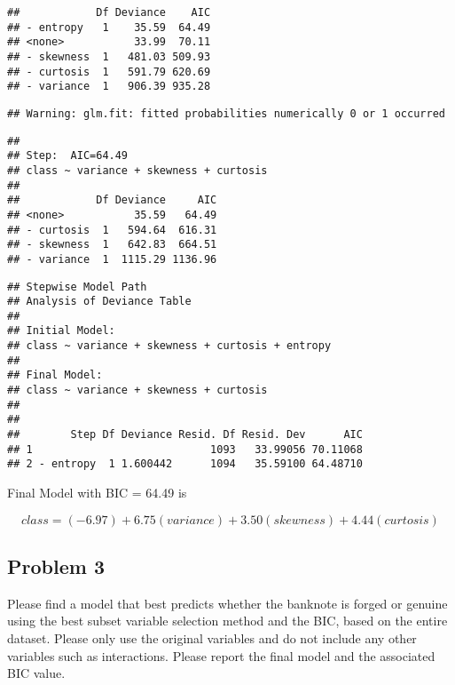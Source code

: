 \documentclass[
]{article}
\newenvironment{Shaded}{\begin{snugshade}}{\end{snugshade}}
\newcommand{\NormalTok}[1]{#1}
\newcommand{\SpecialCharTok}[1]{\textcolor[rgb]{0.00,0.00,0.00}{#1}}
\begin{document}
\begin{verbatim}
##            Df Deviance    AIC
## - entropy   1    35.59  64.49
## <none>           33.99  70.11
## - skewness  1   481.03 509.93
## - curtosis  1   591.79 620.69
## - variance  1   906.39 935.28
\end{verbatim}

\begin{verbatim}
## Warning: glm.fit: fitted probabilities numerically 0 or 1 occurred
\end{verbatim}

\begin{verbatim}
## 
## Step:  AIC=64.49
## class ~ variance + skewness + curtosis
## 
##            Df Deviance     AIC
## <none>           35.59   64.49
## - curtosis  1   594.64  616.31
## - skewness  1   642.83  664.51
## - variance  1  1115.29 1136.96
\end{verbatim}

\begin{Shaded}
\end{Shaded}

\begin{verbatim}
## Stepwise Model Path 
## Analysis of Deviance Table
## 
## Initial Model:
## class ~ variance + skewness + curtosis + entropy
## 
## Final Model:
## class ~ variance + skewness + curtosis
## 
## 
##        Step Df Deviance Resid. Df Resid. Dev      AIC
## 1                            1093   33.99056 70.11068
## 2 - entropy  1 1.600442      1094   35.59100 64.48710
\end{verbatim}

Final Model with BIC = 64.49 is

\[
class = (-6.97) + 6.75(variance) + 3.50(skewness) + 4.44(curtosis)
\]

\hypertarget{problem-3}{%
\subsection{Problem 3}\label{problem-3}}

Please find a model that best predicts whether the banknote is forged or
genuine using the best subset variable selection method and the BIC,
based on the entire dataset. Please only use the original variables and
do not include any other variables such as interactions. Please report
the final model and the associated BIC value.
\end{document}
